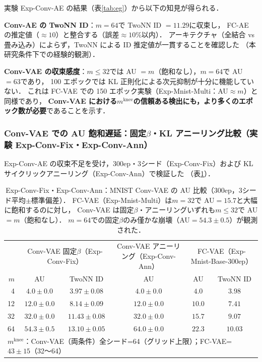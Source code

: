 \documentclass[11pt,a4paper]{jsarticle}
\newcommand{\mknee}{m^{\mathrm{knee}}}
\begin{document}
実験 Exp-Conv-AE の結果（表\ref{tab:eg}）から以下の知見が得られる．

\textbf{Conv-AE の TwoNN ID}：$m = 64$で TwoNN ID $= 11.29$に収束し，
FC-AE の推定値（$\approx 10$）と整合する（誤差$\approx 10\%$以内）．
アーキテクチャ（全結合 vs 畳み込み）によらず，TwoNN による ID 推定値が一貫することを確認した
（本研究条件下での経験的観測）．

\textbf{Conv-VAE の収束感度}：$m \leq 32$では AU $= m$（飽和なし），$m = 64$で AU $= 63$であり，
100 エポックでは KL 正則化による次元抑制が十分に機能していない．
これは FC-VAE での 150 エポック実験（Exp-Mnist-Multi：AU$\approx m$）と同様であり，
\textbf{Conv-VAE における$\mknee$の信頼ある検出にも，より多くのエポック数が必要}であることを示す．

\subsubsection{Conv-VAE での AU 飽和遅延：固定$\beta$・KL アニーリング比較（実験 Exp-Conv-Fix・Exp-Conv-Ann）}
\label{sec:exp_conv_300ep}

Exp-Conv-AE の収束不足を受け，300ep・3シード（Exp-Conv-Fix）および KL サイクリックアニーリング（Exp-Conv-Ann）で検証した
（表\ref{tab:eh_conv_vae}）．

\begin{table}[H]
\centering
\caption{Exp-Conv-Fix・Exp-Conv-Ann：MNIST Conv-VAE の AU 比較（300ep，3シード平均$\pm$標準偏差）．
FC-VAE（Exp-Mnist-Multi）は$m=32$で AU$=15.7$と大幅に飽和するのに対し，
Conv-VAE は固定$\beta$・アニーリングいずれも$m \leq 32$で AU$=m$（飽和なし）．
$m=64$での固定$\beta$のみ僅かな崩壊（AU$=54.3\pm0.5$）が観測された．}
\label{tab:eh_conv_vae}
\small
\begin{tabular}{r ccc cc}
\toprule
 & \multicolumn{2}{c}{Conv-VAE 固定$\beta$（Exp-Conv-Fix）} & \multicolumn{1}{c}{Conv-VAE アニーリング（Exp-Conv-Ann）} & \multicolumn{2}{c}{FC-VAE（Exp-Mnist-Base-300ep）} \\
$m$ & AU & TwoNN ID & AU & AU & TwoNN ID \\
\midrule
 4 & $4.0\pm0.0$ & $3.97\pm0.08$ & $4.0\pm0.0$ & $4.0$ & $3.98$ \\
12 & $12.0\pm0.0$ & $8.14\pm0.09$ & $12.0\pm0.0$ & $10.0$ & $7.41$ \\
32 & $32.0\pm0.0$ & $11.43\pm0.08$ & $32.0\pm0.0$ & $15.7$ & $9.07$ \\
64 & $54.3\pm0.5$ & $13.10\pm0.05$ & $64.0\pm0.0$ & $22.3$ & $10.03$ \\
\midrule
\multicolumn{6}{l}{$\mknee$：Conv-VAE（両条件）全シード=64（グリッド上限）；FC-VAE=$43\pm15$（32〜64）} \\
\bottomrule
\end{tabular}
\end{table}
\end{document}
